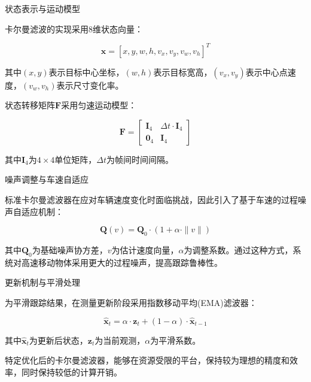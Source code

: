 \documentclass[a4paper, UTF8, fontsize=12pt]{ctexart} %
\numberwithin{equation}{section} %
\begin{document}
\begin{parlist}


\item 状态表示与运动模型

卡尔曼滤波的实现采用8维状态向量：

\begin{equation}
\mathbf{x} = [x, y, w, h, v_x, v_y, v_w, v_h]^T
\end{equation}

其中$(x, y)$表示目标中心坐标，$(w, h)$表示目标宽高，$(v_x, v_y)$表示中心点速度，$(v_w, v_h)$表示尺寸变化率。

状态转移矩阵$\mathbf{F}$采用匀速运动模型：

\begin{equation}
\label{eq:kalman_f}
\mathbf{F} =
\begin{bmatrix}
\mathbf{I}_4 & \Delta t \cdot \mathbf{I}_4 \\
\mathbf{0}_4 & \mathbf{I}_4
\end{bmatrix}
\end{equation}

其中$\mathbf{I}_4$为$4 \times 4$单位矩阵，$\Delta t$为帧间时间间隔。

\item 噪声调整与车速自适应

标准卡尔曼滤波器在应对车辆速度变化时面临挑战，因此引入了基于车速的过程噪声自适应机制：

\begin{equation}
\mathbf{Q}(v) = \mathbf{Q}_0 \cdot (1 + \alpha \cdot \|v\|)
\end{equation}

其中$\mathbf{Q}_0$为基础噪声协方差，$v$为估计速度向量，$\alpha$为调整系数。通过这种方式，系统对高速移动物体采用更大的过程噪声，提高跟踪鲁棒性。

\item 更新机制与平滑处理

为平滑跟踪结果，在测量更新阶段采用指数移动平均(EMA)滤波器：

\begin{equation}
\hat{\mathbf{x}}_t = \alpha \cdot \mathbf{z}_t + (1-\alpha) \cdot \hat{\mathbf{x}}_{t-1}
\end{equation}

其中$\hat{\mathbf{x}}_t$为更新后状态，$\mathbf{z}_t$为当前观测，$\alpha$为平滑系数。

特定优化后的卡尔曼滤波器，能够在资源受限的平台，保持较为理想的精度和效率，同时保持较低的计算开销。

\end{parlist}
\end{document}
